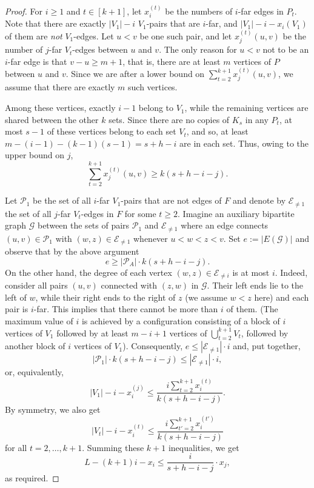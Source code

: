 \documentclass[reqno, 12pt]{amsart}
\numberwithin{equation}{section}
\numberwithin{figure}{section}
\theoremstyle{plain}
\theoremstyle{definition}
\begin{document}
\obtwo*
\begin{proof}
For $i\ge1$ and $t\in[k+1]$, let $x_i^{(t)}$ be the numbers of $i$-far edges in $P_t$.
Note that there are exactly $|V_1|-i$ $V_1$-pairs that are $i$-far, and $|V_1|-i-x_i(V_1)$ of them are \emph{not} $V_1$-edges. Let $u<v$ be one such pair, and let $x_j^{(t)}(u,v)$ be the number of $j$-far $V_t$-edges between $u$ and $v$.
The only reason for $u<v$ not to be an $i$-far edge is that $v-u\ge m+1$, that is, there are at least $m$ vertices of $P$ between $u$ and $v$. Since we are after a lower bound on $\sum_{t=2}^{k+1}x_j^{(t)}(u,v)$, we assume that there are exactly $m$ such vertices.


Among these vertices, exactly $i-1$ belong to $V_1$, while the remaining vertices are shared between the other $k$ sets. Since there are no copies of $K_s$ in any $P_t$, at most $s-1$ of these vertices belong to each set $V_t$, and so, at least $m-(i-1)-(k-1)(s-1)=s+h-i$ are in each set.
Thus, owing to the upper bound on $j$,
 $$\sum_{t=2}^{k+1}x_j^{(t)}(u,v)\ge k\left(s+h-i-j\right).$$


Let ${\mathcal P}_1$ be the set of all $i$-far $V_1$-pairs that are not edges of $F$ and denote by ${\mathcal E}_{\neq 1}$ the set of all $j$-far $V_t$-edges in $F$ for some $t\ge2$.
Imagine an auxiliary bipartite graph $\mathcal G$ between the sets of pairs ${\mathcal P}_1$ and ${\mathcal E}_{\neq 1}$ where an edge connects $(u,v)\in {\mathcal P}_1$ with $(w,z)\in {\mathcal E}_{\neq1}$ whenever $u<w<z<v$. Set $e:=|E(\mathcal G)|$ and observe that by the above argument
$$e\ge|{\mathcal P}_A|\cdot k\left(s+h-i-j\right).$$
On the other hand, the degree of each vertex $(w,z)\in {\mathcal E}_{\neq i}$ is at most $i$. Indeed, consider all pairs $(u,v)$ connected with $(z,w)$ in $\mathcal G$. Their left ends lie to the left of $w$, while their right ends to the right of $z$ (we assume $w<z$ here) and each pair is $i$-far. This implies that there cannot be more than $i$ of them.
(The maximum value of $i$ is achieved by a configuration
consisting of a block of $i$ vertices of $V_1$ followed by at least $m-i+1$ vertices of $\bigcup_{t=2}^{k+1} V_t$, followed by another block of $i$ vertices of $V_1$). Consequently, $e\le |{\mathcal E}_{\neq1}|\cdot i$ and, put together,
  $$|{\mathcal P}_1|\cdot k\left(s+h-i-j\right)\le|{\mathcal E}_{\neq1}|\cdot i,$$ or, equivalently,
  $$|V_1|-i-x_i^{(j)}\le \frac {i\sum_{t=2}^{k+1} x_i^{(t)}}{k\left(s+h-i-j\right)} .$$
  By symmetry, we also get
  $$|V_t|-i-x_i^{(t)}\le \frac{i\sum_{t'=2}^{k+1} x_i^{(t')}}{k\left(s+h-i-j\right)}$$
  for all $t=2,\dots,k+1$. Summing these $k+1$ inequalities, we get
 $$L-(k+1)i-x_i\le \frac {i}{s+h-i-j}\cdot x_j,$$	
 as required.
 \end{proof}
	
	
\end{document}
